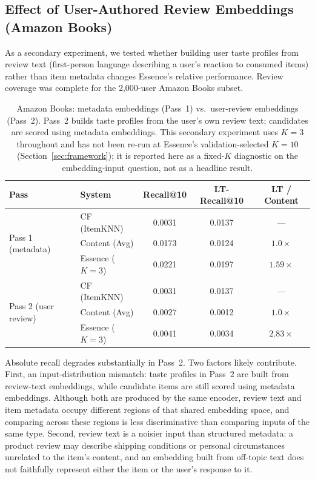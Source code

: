\documentclass[11pt,a4paper]{article}
\begin{document}
\subsection{Effect of User-Authored Review Embeddings (Amazon Books)}
\label{sec:pass2}

As a secondary experiment, we tested whether building user taste profiles
from review text (first-person language describing a user's reaction to
consumed items) rather than item metadata changes Essence's relative
performance. Review coverage was complete for the 2{,}000-user Amazon Books
subset.

\begin{table}[H]
\centering
\caption{Amazon Books: metadata embeddings (Pass~1) vs.\ user-review
         embeddings (Pass~2). Pass~2 builds taste profiles from the user's
         own review text; candidates are scored using metadata embeddings.
         This secondary experiment uses $K=3$ throughout and has not been
         re-run at Essence's validation-selected $K=10$ (Section~\ref{sec:framework});
         it is reported here as a fixed-$K$ diagnostic on the embedding-input
         question, not as a headline result.}
\label{tab:amazon_pass2}
\begin{tabular}{llccc}
\toprule
\textbf{Pass} & \textbf{System} & \textbf{Recall@10}
              & \textbf{LT-Recall@10} & \textbf{LT / Content} \\
\midrule
\multirow{3}{*}{Pass 1 (metadata)}
  & CF (ItemKNN)    & 0.0031 & 0.0137 & ---          \\
  & Content (Avg)   & 0.0173 & 0.0124 & $1.0\times$  \\
  & Essence ($K=3$) & 0.0221 & 0.0197 & $1.59\times$ \\
\midrule
\multirow{3}{*}{Pass 2 (user review)}
  & CF (ItemKNN)    & 0.0031 & 0.0137 & ---          \\
  & Content (Avg)   & 0.0027 & 0.0012 & $1.0\times$  \\
  & Essence ($K=3$) & 0.0041 & 0.0034 & $2.83\times$ \\
\bottomrule
\end{tabular}
\end{table}

Absolute recall degrades substantially in Pass~2. Two factors likely
contribute. First, an input-distribution mismatch: taste profiles in Pass~2 are built from
review-text embeddings, while candidate items are still scored using metadata embeddings.
Although both are produced by the same encoder, review text and item metadata occupy
different regions of that shared embedding space, and comparing across these regions is
less discriminative than comparing inputs of the same type. Second,
review text is a noisier input than structured metadata: a product review
may describe shipping conditions or personal circumstances unrelated to the
item's content, and an embedding built from off-topic text does not
faithfully represent either the item or the user's response to it.
\end{document}
